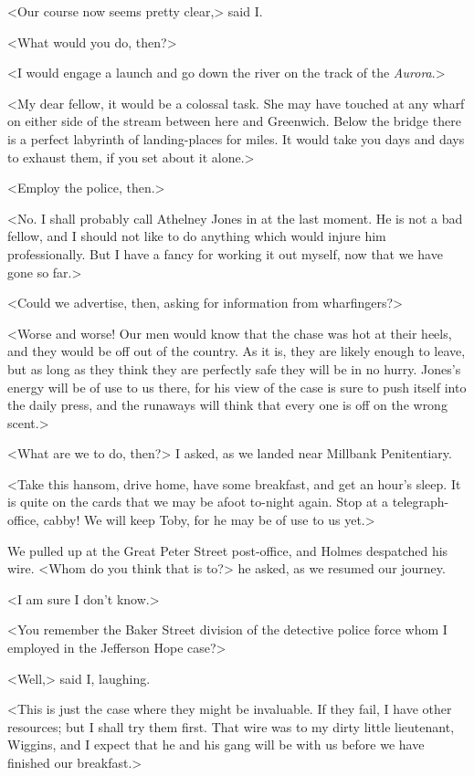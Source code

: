 <Our course now seems pretty clear,> said I\@.

<What would you do, then?>

<I would engage a launch and go down the river on the track of the \textit{Aurora}.>

<My dear fellow, it would be a colossal task. She may have touched at any wharf on either side of the stream between here and Greenwich. Below the bridge there is a perfect labyrinth of landing-places for miles. It would take you days and days to exhaust them, if you set about it alone.>

<Employ the police, then.>

<No. I shall probably call Athelney Jones in at the last moment. He is not a bad fellow, and I should not like to do anything which would injure him professionally. But I have a fancy for working it out myself, now that we have gone so far.>

<Could we advertise, then, asking for information from wharfingers?>

<Worse and worse! Our men would know that the chase was hot at their heels, and they would be off out of the country. As it is, they are likely enough to leave, but as long as they think they are perfectly safe they will be in no hurry. Jones's energy will be of use to us there, for his view of the case is sure to push itself into the daily press, and the runaways will think that every one is off on the wrong scent.>

<What are we to do, then?> I asked, as we landed near Millbank Penitentiary.

<Take this hansom, drive home, have some breakfast, and get an hour's sleep. It is quite on the cards that we may be afoot to-night again. Stop at a telegraph-office, cabby! We will keep Toby, for he may be of use to us yet.>

We pulled up at the Great Peter Street post-office, and Holmes despatched his wire. <Whom do you think that is to?> he asked, as we resumed our journey.

<I am sure I don't know.>

<You remember the Baker Street division of the detective police force whom I employed in the Jefferson Hope case?>

<Well,> said I, laughing.

<This is just the case where they might be invaluable. If they fail, I have other resources; but I shall try them first. That wire was to my dirty little lieutenant, Wiggins, and I expect that he and his gang will be with us before we have finished our breakfast.>

